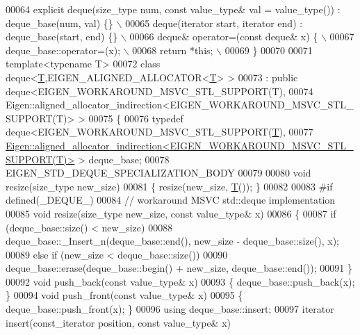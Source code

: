 \begin{DoxyCode}
00064 \textcolor{preprocessor}{    explicit deque(size\_type num, const value\_type& val = value\_type()) : deque\_base(num, val) \{\} \(\backslash\)}
00065 \textcolor{preprocessor}{    deque(iterator start, iterator end) : deque\_base(start, end) \{\}  \(\backslash\)}
00066 \textcolor{preprocessor}{    deque& operator=(const deque& x) \{  \(\backslash\)}
00067 \textcolor{preprocessor}{      deque\_base::operator=(x);  \(\backslash\)}
00068 \textcolor{preprocessor}{      return *this;  \(\backslash\)}
00069 \textcolor{preprocessor}{    \}}
00070 
00071   \textcolor{keyword}{template}<\textcolor{keyword}{typename} T>
00072   \textcolor{keyword}{class }deque<\hyperlink{group___sparse_core___module_class_eigen_1_1_triplet}{T},EIGEN\_ALIGNED\_ALLOCATOR<\hyperlink{group___sparse_core___module_class_eigen_1_1_triplet}{T}> >
00073     : \textcolor{keyword}{public} deque<EIGEN\_WORKAROUND\_MSVC\_STL\_SUPPORT(T),
00074                    Eigen::aligned\_allocator\_indirection<EIGEN\_WORKAROUND\_MSVC\_STL\_SUPPORT(T)> >
00075 \{
00076   \textcolor{keyword}{typedef} deque<EIGEN\_WORKAROUND\_MSVC\_STL\_SUPPORT(\hyperlink{group___sparse_core___module_class_eigen_1_1_triplet}{T}),
00077                 
      \hyperlink{class_eigen_1_1aligned__allocator__indirection}{Eigen::aligned\_allocator\_indirection<EIGEN\_WORKAROUND\_MSVC\_STL\_SUPPORT(T)>}
       > deque\_base;
00078   EIGEN\_STD\_DEQUE\_SPECIALIZATION\_BODY
00079 
00080   \textcolor{keywordtype}{void} resize(size\_type new\_size)
00081   \{ resize(new\_size, \hyperlink{group___sparse_core___module_class_eigen_1_1_triplet}{T}()); \}
00082 
00083 \textcolor{preprocessor}{#if defined(\_DEQUE\_)}
00084   \textcolor{comment}{// workaround MSVC std::deque implementation}
00085   \textcolor{keywordtype}{void} resize(size\_type new\_size, \textcolor{keyword}{const} value\_type& x)
00086   \{
00087     \textcolor{keywordflow}{if} (deque\_base::size() < new\_size)
00088       deque\_base::\_Insert\_n(deque\_base::end(), new\_size - deque\_base::size(), x);
00089     \textcolor{keywordflow}{else} \textcolor{keywordflow}{if} (new\_size < deque\_base::size())
00090       deque\_base::erase(deque\_base::begin() + new\_size, deque\_base::end());
00091   \}
00092   \textcolor{keywordtype}{void} push\_back(\textcolor{keyword}{const} value\_type& x)
00093   \{ deque\_base::push\_back(x); \} 
00094   \textcolor{keywordtype}{void} push\_front(\textcolor{keyword}{const} value\_type& x)
00095   \{ deque\_base::push\_front(x); \}
00096   \textcolor{keyword}{using} deque\_base::insert;  
00097   iterator insert(const\_iterator position, \textcolor{keyword}{const} value\_type& x)

\end{DoxyCode}
